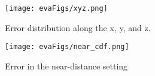 
\begin{figure}
\setlength{\abovecaptionskip}{-0.15cm} %
\setlength{\belowcaptionskip}{-0.2cm}
\setlength{\subfigcapskip}{-0.25cm}
  \begin{minipage}[t]{0.48\columnwidth}
    \centering
    \texttt{[image: evaFigs/xyz.png]}
    \caption{Error distribution along the x, y, and z.}
    \label{fig:xyz}
  \end{minipage}
  \begin{minipage}[t]{0.48\columnwidth}
    \centering
    \texttt{[image: evaFigs/near\_cdf.png]}
    \caption{Error in the near-distance setting}
    \label{fig:near_cdf}
  \end{minipage}
  \hfill
  \vspace{-0.5cm}
\end{figure}




